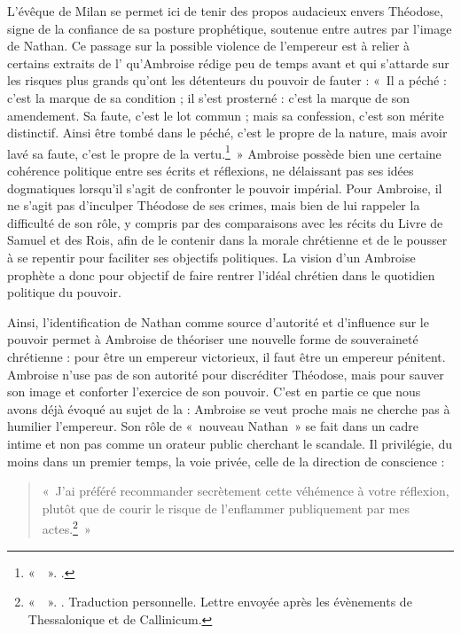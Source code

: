 L'évêque de Milan se permet ici de tenir des propos audacieux envers Théodose, signe de la confiance de sa posture prophétique, soutenue entre autres par l'image de Nathan. Ce passage sur la possible violence de l'empereur est à relier à certains extraits de l' qu'Ambroise rédige peu de temps avant et qui s'attarde sur les risques plus grands qu'ont les détenteurs du pouvoir de fauter : «~Il a péché : c'est la marque de sa condition ; il s'est prosterné : c'est la marque de son amendement. Sa faute, c'est le lot commun ; mais sa confession, c'est son mérite distinctif. Ainsi être tombé dans le péché, c'est le propre de la nature, mais avoir lavé sa faute, c'est le propre de la vertu.\footnote{«~~». \cite[\nopp IV, 15]{ambroise_apologie_david}.}~» Ambroise possède bien une certaine cohérence politique entre ses écrits et réflexions, ne délaissant pas ses idées dogmatiques lorsqu'il s'agit de confronter le pouvoir impérial. Pour Ambroise, il ne s'agit pas d'inculper Théodose de ses crimes, mais bien de lui rappeler la difficulté de son rôle, y compris par des comparaisons avec les récits du Livre de Samuel et des Rois, afin de le contenir dans la morale chrétienne et de le pousser à se repentir pour faciliter ses objectifs politiques. La vision d'un Ambroise prophète a donc pour objectif de faire rentrer l'idéal chrétien dans le quotidien politique du pouvoir.

\bigskip

Ainsi, l'identification de Nathan comme source d'autorité et d'influence sur le pouvoir permet à Ambroise de théoriser une nouvelle forme de souveraineté chrétienne : pour être un empereur victorieux, il faut être un empereur pénitent. Ambroise n'use pas de son autorité pour discréditer Théodose, mais pour sauver son image et conforter l'exercice de son pouvoir. C'est en partie ce que nous avons déjà évoqué au sujet de la  : Ambroise se veut proche mais ne cherche pas à humilier l'empereur. Son rôle de «~nouveau Nathan~» se fait dans un cadre intime et non pas comme un orateur public cherchant le scandale. Il privilégie, du moins dans un premier temps, la voie privée, celle de la direction de conscience :

\bigskip

\begin{quote}
    «~J’ai préféré recommander secrètement cette véhémence à votre réflexion, plutôt que de courir le risque de l’enflammer publiquement par mes actes.\footnote{«~~». \cite[\nopp ec 11, 5]{ambroise_csel_82_3}. Traduction personnelle. Lettre envoyée après les évènements de Thessalonique et de Callinicum.}~»
\end{quote}

